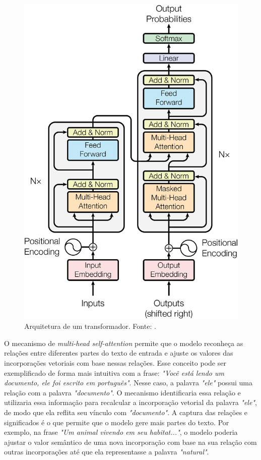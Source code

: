 \begin{figure}[ht]
      \centering
      \includegraphics[width=0.4\columnwidth,keepaspectratio]{images/transformer.png}
      \caption{Arquitetura de um transformador. Fonte: \textcite{transformer}.}
      \label{fig:transformer}
\end{figure}

O mecanismo de \textit{multi-head self-attention} permite que o modelo reconheça as relações entre diferentes partes do texto de entrada e ajuste os valores das
incorporações vetoriais com base nessas relações. Esse conceito pode ser exemplificado de forma mais intuitiva com a frase: \textit{"Você está lendo um documento, ele foi
escrito em português"}. Nesse caso, a palavra \textit{"ele"} possui uma relação com a palavra \textit{"documento"}. O mecanismo identificaria essa relação e utilizaria
essa informação para recalcular a incorporação vetorial da palavra \textit{"ele"}, de modo que ela reflita seu vínculo com \textit{"documento"}. A captura das relações e
significados é o que permite que o modelo gere mais partes do texto. Por exemplo, na frase \textit{"Um animal vivendo em seu habitat..."}, o modelo poderia ajustar o
valor semântico de uma nova incorporação com base na sua relação com outras incorporações até que ela representasse a palavra \textit{"natural"}.

